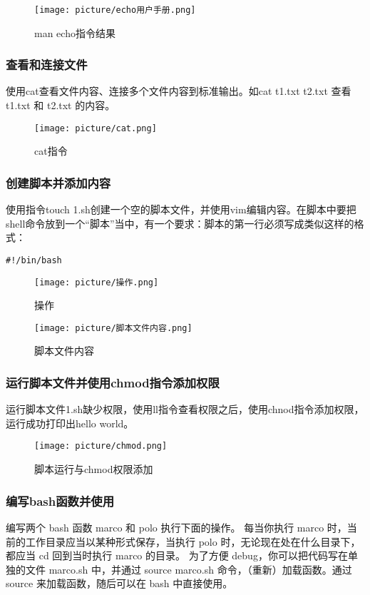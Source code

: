 \documentclass[UTF8]{ctexart}
\begin{document}
\begin{figure}[H]
    \centering
    \texttt{[image: picture/echo用户手册.png]}%
    \caption{man echo指令结果}
\end{figure}

\subsubsection{查看和连接文件}
使用cat查看文件内容、连接多个文件内容到标准输出。如cat t1.txt t2.txt 查看 t1.txt 和 t2.txt 的内容。
\begin{figure}[H]
    \centering
    \texttt{[image: picture/cat.png]}%
    \caption{cat指令}
\end{figure}

\subsubsection{创建脚本并添加内容}
使用指令touch 1.sh创建一个空的脚本文件，并使用vim编辑内容。在脚本中要把shell命令放到一个“脚本”当中，有一个要求：脚本的第一行必须写成类似这样的格式：

\verb|#!/bin/bash|
\begin{figure}[H]
    \centering
    \texttt{[image: picture/操作.png]}%
    \caption{操作}
\end{figure}

\begin{figure}[H]
    \centering
    \texttt{[image: picture/脚本文件内容.png]}%
    \caption{脚本文件内容}
\end{figure}

\subsubsection{运行脚本文件并使用chmod指令添加权限}
运行脚本文件1.sh缺少权限，使用ll指令查看权限之后，使用chnod指令添加权限，运行成功打印出hello world。
\begin{figure}[H]
    \centering
    \texttt{[image: picture/chmod.png]}%
    \caption{脚本运行与chmod权限添加}
\end{figure}



\subsubsection{编写bash函数并使用}
编写两个 bash 函数 marco 和 polo 执行下面的操作。 每当你执行 marco 时，当前的工作目录应当以某种形式保存，当执行 polo 时，无论现在处在什么目录下，都应当 cd 回到当时执行 marco 的目录。 为了方便 debug，你可以把代码写在单独的文件 marco.sh 中，并通过 source marco.sh 命令，（重新）加载函数。通过 source 来加载函数，随后可以在 bash 中直接使用。
\end{document}
